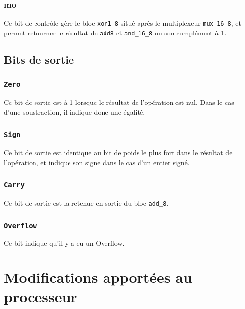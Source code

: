 \documentclass[11pt, a4paper, twoside, titlepage]{article}
\begin{document}
\subsubsection{mo}
	Ce bit de contrôle gère le bloc \texttt{xor1\_8} situé après le multiplexeur \texttt{mux\_16\_8}, et permet retourner le résultat de \texttt{add8} et \texttt{and\_16\_8} ou son complément à 1.

\subsection{Bits de sortie}

\subsubsection{\texttt{Zero}}
	Ce bit de sortie est à 1 lorsque le résultat de l'opération est nul. Dans le cas d'une soustraction, il indique donc une égalité.

\subsubsection{\texttt{Sign}}
	Ce bit de sortie est identique au bit de poids le plus fort dans le résultat de l'opération, et indique son signe dans le cas d'un entier signé.

\subsubsection{\texttt{Carry}}
	Ce bit de sortie est la retenue en sortie du bloc \texttt{add\_8}.
\subsubsection{\texttt{Overflow}}
	Ce bit indique qu'il y a eu un Overflow.

\section{Modifications apportées au processeur}
\end{document}
